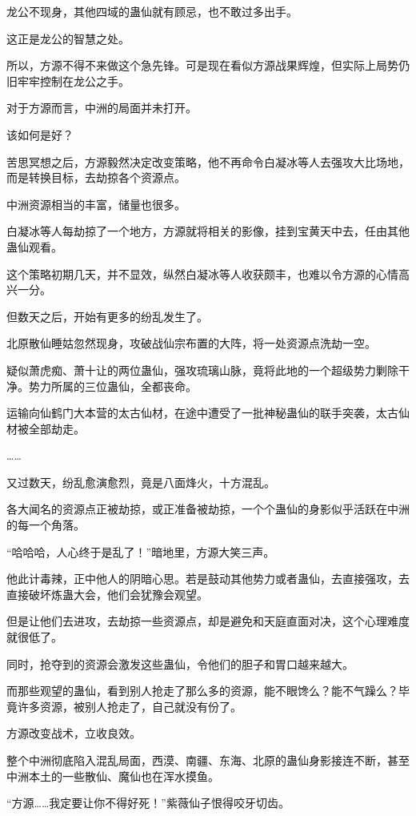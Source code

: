 \begin{this_body}
龙公不现身，其他四域的蛊仙就有顾忌，也不敢过多出手。

这正是龙公的智慧之处。

所以，方源不得不来做这个急先锋。可是现在看似方源战果辉煌，但实际上局势仍旧牢牢控制在龙公之手。

对于方源而言，中洲的局面并未打开。

该如何是好？

苦思冥想之后，方源毅然决定改变策略，他不再命令白凝冰等人去强攻大比场地，而是转换目标，去劫掠各个资源点。

中洲资源相当的丰富，储量也很多。

白凝冰等人每劫掠了一个地方，方源就将相关的影像，挂到宝黄天中去，任由其他蛊仙观看。

这个策略初期几天，并不显效，纵然白凝冰等人收获颇丰，也难以令方源的心情高兴一分。

但数天之后，开始有更多的纷乱发生了。

北原散仙睡姑忽然现身，攻破战仙宗布置的大阵，将一处资源点洗劫一空。

疑似萧虎痴、萧十让的两位蛊仙，强攻琉璃山脉，竟将此地的一个超级势力剿除干净。势力所属的三位蛊仙，全都丧命。

运输向仙鹤门大本营的太古仙材，在途中遭受了一批神秘蛊仙的联手突袭，太古仙材被全部劫走。

……

又过数天，纷乱愈演愈烈，竟是八面烽火，十方混乱。

各大闻名的资源点正被劫掠，或正准备被劫掠，一个个蛊仙的身影似乎活跃在中洲的每一个角落。

“哈哈哈，人心终于是乱了！”暗地里，方源大笑三声。

他此计毒辣，正中他人的阴暗心思。若是鼓动其他势力或者蛊仙，去直接强攻，去直接破坏炼蛊大会，他们会犹豫会观望。

但是让他们去进攻，去劫掠一些资源点，却是避免和天庭直面对决，这个心理难度就很低了。

同时，抢夺到的资源会激发这些蛊仙，令他们的胆子和胃口越来越大。

而那些观望的蛊仙，看到别人抢走了那么多的资源，能不眼馋么？能不气躁么？毕竟许多资源，被别人抢走了，自己就没有份了。

方源改变战术，立收良效。

整个中洲彻底陷入混乱局面，西漠、南疆、东海、北原的蛊仙身影接连不断，甚至中洲本土的一些散仙、魔仙也在浑水摸鱼。

“方源……我定要让你不得好死！”紫薇仙子恨得咬牙切齿。


\end{this_body}
